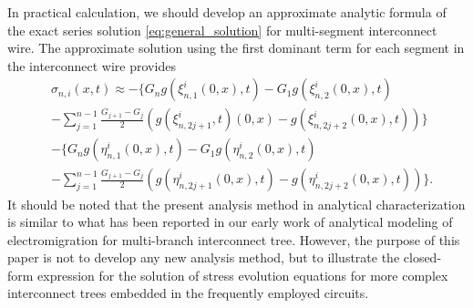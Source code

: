In practical calculation, we should develop an approximate analytic formula of the exact series solution \eqref{eq:general_solution} for multi-segment interconnect wire. The approximate solution using the first dominant term for each segment in the interconnect wire provides
\begin{equation} \label{eq:approximate_solution}
\begin{split}
&\sigma_{n,i}(x,t)\approx-\{G_ng(\xi_{n,1}^{i}(0,x),t)-G_1g(\xi_{n,2}^{i}(0,x),t)\\
&-\sum\limits_{j=1}^{n-1}\frac{G_{j+1}-G_j}{2}(g(\xi_{n,2j+1}^{i},t)(0,x)-g(\xi_{n,2j+2}^{i}(0,x),t))\}\\
&-\{G_ng(\eta_{n,1}^{i}(0,x),t)-G_1g(\eta_{n,2}^{i}(0,x),t)\\
&-\sum\limits_{j=1}^{n-1}\frac{G_{j+1}-G_j}{2}(g(\eta_{n,2j+1}^{i}(0,x),t)-g(\eta_{n,2j+2}^{i}(0,x),t))\}.
 \end{split}
 \end{equation}
It should be noted that the present analysis method in analytical characterization is similar to what has been reported in our early work of analytical modeling of electromigration for multi-branch interconnect tree. However, the purpose of this paper is not to develop any new analysis method, but to illustrate the closed-form expression for the solution of stress evolution equations for more complex interconnect trees embedded in the frequently employed circuits. 







